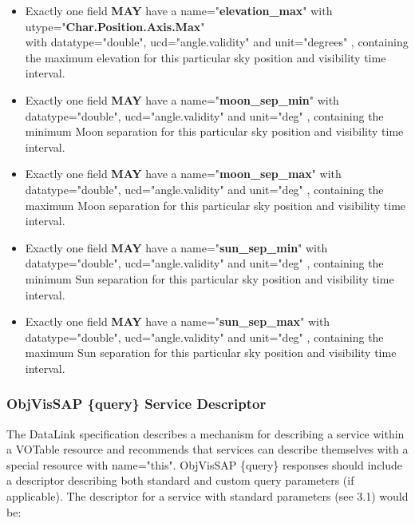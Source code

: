 \documentclass[11pt,a4paper]{ivoa}
\begin{document}
\begin{itemize}
\item Exactly one field \textbf{MAY }have a name="\textbf{elevation\_max}" with\\
utype="\textbf{Char.Position.Axis.Max}"\\
with datatype="double", ucd="angle.validity" and unit="degrees" , containing
the maximum elevation for this particular sky position and visibility
time interval.
\end{itemize}


\begin{itemize}
\item Exactly one field \textbf{MAY }have a name="\textbf{moon\_sep\_min}" 
with datatype="double", ucd="angle.validity" and
unit="deg" , containing the minimum Moon separation for this particular
sky position and visibility time interval.
\end{itemize}


\begin{itemize}
\item Exactly one field \textbf{MAY }have a name="\textbf{moon\_sep\_max}" 
with datatype="double", ucd="angle.validity" and
unit="deg" , containing the maximum Moon separation for this particular
sky position and visibility time interval.
\end{itemize}


\begin{itemize}
\item Exactly one field \textbf{MAY }have a name="\textbf{sun\_sep\_min}" with\\
datatype="double", ucd="angle.validity" and
unit="deg" , containing the minimum Sun separation for this particular
sky position and visibility time interval.
\end{itemize}


\begin{itemize}
\item Exactly one field \textbf{MAY }have a name="\textbf{sun\_sep\_max}" with\\
datatype="double", ucd="angle.validity" and
unit="deg" , containing the maximum Sun separation for this particular
sky position and visibility time interval.
\end{itemize}

\subsubsection{ObjVisSAP \{query\} Service Descriptor}
The DataLink specification describes a mechanism for describing a
service within a VOTable resource and recommends that services can
describe themselves with a special resource with name="this". ObjVisSAP
\{query\} responses should include a descriptor describing both standard
and custom query parameters (if applicable). The descriptor for a
service with standard parameters (see 3.1) would be:\\
\end{document}

